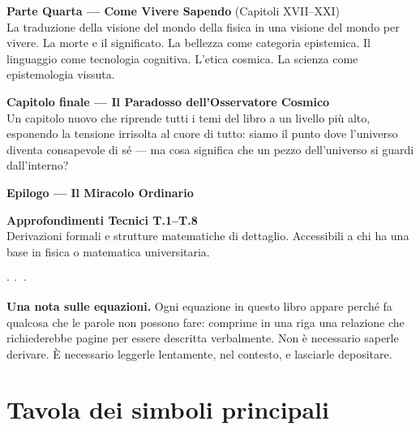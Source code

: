 \documentclass[12pt,a4paper,openany]{book}
\newcommand{\puntini}{\begin{center}$\cdot\ \cdot\ \cdot$\end{center}\vspace{0.3em}}
\begin{document}
\textbf{Parte Quarta — Come Vivere Sapendo} (Capitoli XVII–XXI)\\
La traduzione della visione del mondo della fisica in una visione del mondo per vivere. La morte e il significato. La bellezza come categoria epistemica. Il linguaggio come tecnologia cognitiva. L'etica cosmica. La scienza come epistemologia vissuta.

\textbf{Capitolo finale — Il Paradosso dell'Osservatore Cosmico}\\
Un capitolo nuovo che riprende tutti i temi del libro a un livello più alto, esponendo la tensione irrisolta al cuore di tutto: siamo il punto dove l'universo diventa consapevole di sé — ma cosa significa che un pezzo dell'universo si guardi dall'interno?

\textbf{Epilogo — Il Miracolo Ordinario}

\textbf{Approfondimenti Tecnici T.1–T.8}\\
Derivazioni formali e strutture matematiche di dettaglio. Accessibili a chi ha una base in fisica o matematica universitaria.

\puntini

\textbf{Una nota sulle equazioni.} Ogni equazione in questo libro appare perché fa qualcosa che le parole non possono fare: comprime in una riga una relazione che richiederebbe pagine per essere descritta verbalmente. Non è necessario saperle derivare. È necessario leggerle lentamente, nel contesto, e lasciarle depositare.

\clearpage

\chapter*{Tavola dei simboli principali}
\end{document}

